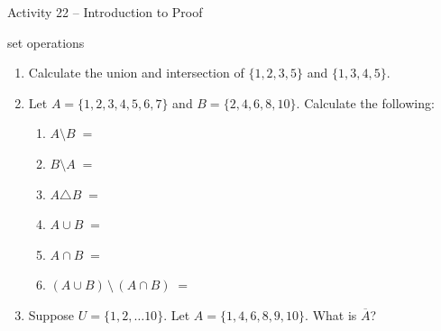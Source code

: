 \documentclass{amsart}
\begin{document}
\thispagestyle{empty}

\centerline{\Large Activity 22 -- Introduction to Proof}
\centerline{\large set operations}

\bigskip
\Large


\begin{enumerate}

\item Calculate the union and intersection of $\{1, 2, 3, 5 \}$ and $\{ 1, 3, 4, 5 \}$.

\vfill

\item Let $A = \{1, 2, 3, 4, 5, 6, 7 \}$ and $B = \{2, 4, 6, 8, 10\}$. Calculate the following:

\vspace{.2in}

\begin{enumerate}
\item $A \setminus B \; = $

\vspace{.2in}

\item $B \setminus A \; = $

\vspace{.2in}

\item $A \triangle B \; = $

\vspace{.2in}

\item $A \cup B \; = $

\vspace{.2in}

\item $A \cap B \; = $

\vspace{.2in}

\item $(A \cup B) \, \setminus \, (A \cap B) \; = $

\vspace{.7in}

\end{enumerate}

\item Suppose $U = \{1, 2, \ldots 10 \}$.  Let $A = \{1, 4, 6, 8, 9, 10 \}$.  What is $\overline{A}$?

\vfill

\newpage


\end{enumerate}
\end{document}

